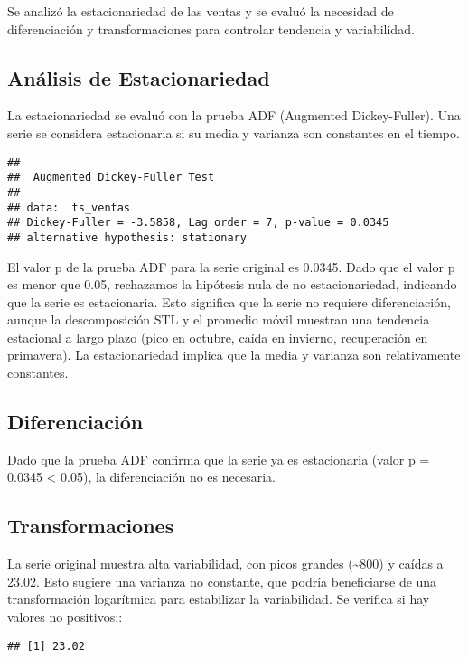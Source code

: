 \documentclass[
]{book}
\begin{document}
Se analizó la estacionariedad de las ventas y se evaluó la necesidad de
diferenciación y transformaciones para controlar tendencia y
variabilidad.

\subsection{Análisis de
Estacionariedad}\label{anuxe1lisis-de-estacionariedad}

La estacionariedad se evaluó con la prueba ADF (Augmented
Dickey-Fuller). Una serie se considera estacionaria si su media y
varianza son constantes en el tiempo.

\begin{verbatim}
## 
##  Augmented Dickey-Fuller Test
## 
## data:  ts_ventas
## Dickey-Fuller = -3.5858, Lag order = 7, p-value = 0.0345
## alternative hypothesis: stationary
\end{verbatim}

El valor p de la prueba ADF para la serie original es 0.0345. Dado que
el valor p es menor que 0.05, rechazamos la hipótesis nula de no
estacionariedad, indicando que la serie es estacionaria. Esto significa
que la serie no requiere diferenciación, aunque la descomposición STL y
el promedio móvil muestran una tendencia estacional a largo plazo (pico
en octubre, caída en invierno, recuperación en primavera). La
estacionariedad implica que la media y varianza son relativamente
constantes.

\subsection{Diferenciación}\label{diferenciaciuxf3n}

Dado que la prueba ADF confirma que la serie ya es estacionaria (valor p
= 0.0345 \textless{} 0.05), la diferenciación no es necesaria.

\subsection{Transformaciones}\label{transformaciones}

La serie original muestra alta variabilidad, con picos grandes
(\textasciitilde800) y caídas a 23.02. Esto sugiere una varianza no
constante, que podría beneficiarse de una transformación logarítmica
para estabilizar la variabilidad. Se verifica si hay valores no
positivos::

\begin{verbatim}
## [1] 23.02
\end{verbatim}
\end{document}
